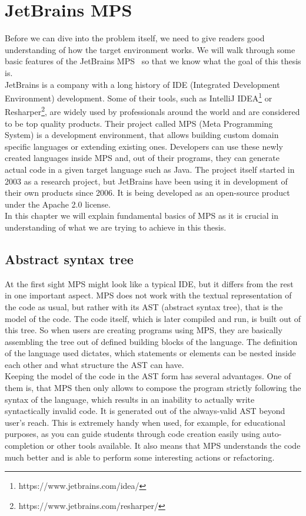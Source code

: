 \chapter{JetBrains MPS}

Before we can dive into the problem itself, we need to give readers good understanding of how the target environment works.
We will walk through some basic features of the JetBrains MPS~\cite{MPS} so that we know what the goal of this thesis is.
\\

JetBrains is a company with a long history of IDE (Integrated Development Environment) development.
Some of their tools, such as IntelliJ IDEA\footnote{https://www.jetbrains.com/idea/} or Resharper\footnote{https://www.jetbrains.com/resharper/}, are widely used by professionals around the world and are considered to be top quality products.
Their project called MPS (Meta Programming System) is a development environment, that allows building custom domain specific languages or extending existing ones.
Developers can use these newly created languages inside MPS and, out of their programs, they can generate actual code in a given target language such as Java.
The project itself started in 2003 as a research project, but JetBrains have been using it in development of their own products since 2006.
It is being developed as an open-source product under the Apache 2.0 license.
\\

In this chapter we will explain fundamental basics of MPS as it is crucial in understanding of what we are trying to achieve in this thesis.

\section{Abstract syntax tree}
At the first sight MPS might look like a typical IDE, but it differs from the rest in one important aspect.
MPS does not work with the textual representation of the code as usual, but rather with its AST (abstract syntax tree), that is the model of the code.
The code itself, which is later compiled and run, is built out of this tree.
So when users are creating programs using MPS, they are basically assembling the tree out of defined building blocks of the language.
The definition of the language used dictates, which statements or elements can be nested inside each other and what structure the AST can have.
\\

Keeping the model of the code in the AST form has several advantages.
One of them is, that  MPS then only allows to compose the program strictly following the syntax of the language, which results in an inability to actually write syntactically invalid code.
It is generated out of the always-valid AST beyond user's reach.
This is extremely handy when used, for example, for educational purposes, as you can guide students through code creation easily using auto-completion or other tools available.
It also means that MPS understands the code much better and is able to perform some interesting actions or refactoring.
\\

